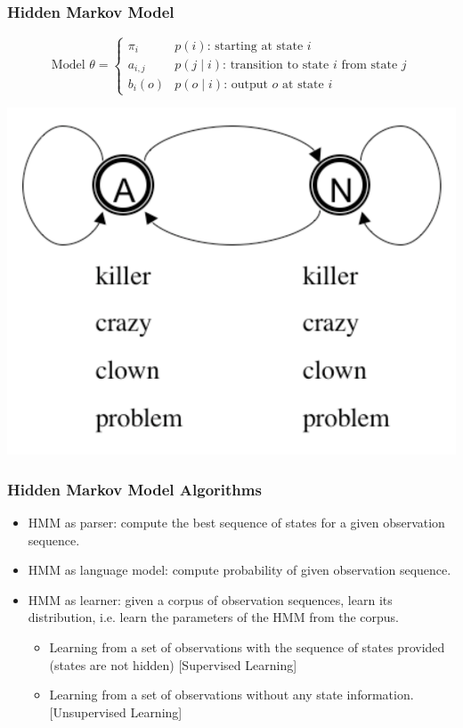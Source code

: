 \begin{frame}
\frametitle{Hidden Markov Model}
\[
\textrm{Model $\theta$} = \left\{ 
\begin{array}{ll} 
\pi_i & \textrm{$p(i)$: starting at state $i$} \\ 
a_{i,j} & \textrm{$p(j \mid i)$: transition to state $i$ from state $j$} \\ 
b_i(o) & \textrm{$p( o \mid i)$: output $o$ at state $i$}
\end{array} 
\right.\]

\begin{center}
\includegraphics[scale=.4]{figures/hmmfig}
\end{center}
\end{frame}

\begin{frame}
\frametitle{Hidden Markov Model Algorithms}
\begin{itemize}
\item HMM as parser: compute the best sequence of states for a given observation sequence.
\item HMM as language model: compute probability of given observation sequence.
\item HMM as learner: given a corpus of observation sequences, learn its distribution, i.e. learn the parameters of the HMM from the corpus.
\begin{itemize}
\item Learning from a set of observations with the sequence of states provided (states are not hidden) {\color{blue} [Supervised Learning]}
\item Learning from a set of observations without any state information. {\color{blue} [Unsupervised Learning]}
\end{itemize}
\end{itemize}
\end{frame}

